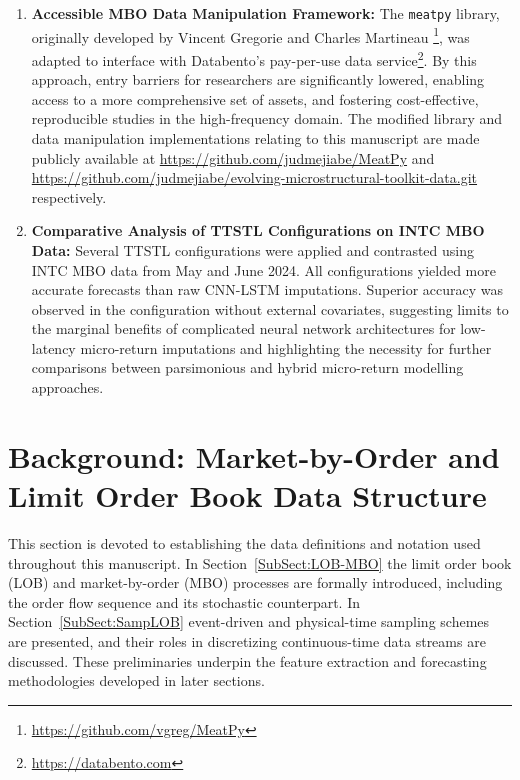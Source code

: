 \documentclass[10pt,a4paper,oneside]{article}
\begin{document}
\begin{enumerate}
    \item \textbf{Accessible MBO Data Manipulation Framework:} The \verb|meatpy| library, originally developed by Vincent Gregorie and Charles Martineau \footnote{\url{https://github.com/vgreg/MeatPy}}, was adapted to interface with Databento’s pay-per-use data service\footnote{\url{https://databento.com}}. By this approach, entry barriers for researchers are significantly lowered, enabling access to a more comprehensive set of assets, and fostering cost-effective, reproducible studies in the high-frequency domain. The modified library and data manipulation implementations relating to this manuscript are made publicly available at \url{https://github.com/judmejiabe/MeatPy} and \url{https://github.com/judmejiabe/evolving-microstructural-toolkit-data.git} respectively.

    \item \textbf{Comparative Analysis of TTSTL Configurations on INTC MBO Data:} Several TTSTL configurations were applied and contrasted using INTC MBO data from May and June 2024. All configurations yielded more accurate forecasts than raw CNN-LSTM imputations. Superior accuracy was observed in the configuration without external covariates, suggesting limits to the marginal benefits of complicated neural network architectures for low-latency micro-return imputations and highlighting the necessity for further comparisons between parsimonious and hybrid micro-return modelling approaches.
\end{enumerate}


\section{Background: Market-by-Order and Limit Order Book Data Structure}
\label{Sect:BckGrnd}

This section is devoted to establishing the data definitions and notation used throughout this manuscript.  In Section~\ref{SubSect:LOB-MBO} the limit order book (LOB) and market-by-order (MBO) processes are formally introduced, including the order flow sequence and its stochastic counterpart.  In Section~\ref{SubSect:SampLOB} event-driven and physical-time sampling schemes are presented, and their roles in discretizing continuous-time data streams are discussed.  These preliminaries underpin the feature extraction and forecasting methodologies developed in later sections.
\end{document}
